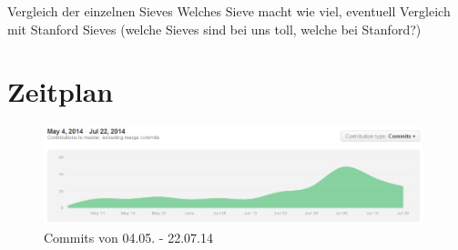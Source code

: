 \documentclass[11pt,a4paper]{beamer}
\begin{document}
\begin{frame}{Vergleich der einzelnen Sieves}
Welches Sieve macht wie viel, eventuell Vergleich mit Stanford Sieves (welche Sieves sind bei uns toll, welche bei Stanford?)

\end{frame}
  

\section{Zeitplan}

\begin{frame}

    \begin{gantt}{10}{9}
    \begin{ganttitle}
    \end{ganttitle}
    \begin{ganttitle}
    \end{ganttitle}
  \end{gantt}
  
\end{frame}

\begin{frame}
\begin{figure}
\begin{center}
\includegraphics[width=11cm]{contributions_to_master.jpg}
\caption{Commits von 04.05. - 22.07.14}
\label{fig:contributions}
\end{center}
\end{figure}
\end{frame}
\end{document}

